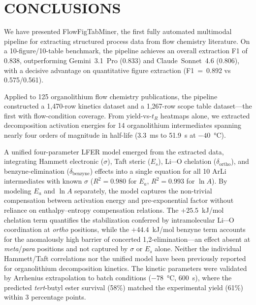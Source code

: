 \documentclass[journal=jcisd8,manuscript=article]{achemso}
\begin{document}

\FloatBarrier
\section{CONCLUSIONS}

We have presented FlowFigTabMiner, the first fully automated multimodal pipeline for extracting structured process data from flow chemistry literature.
On a 10-figure/10-table benchmark, the pipeline achieves an overall extraction F1 of 0.838, outperforming Gemini~3.1~Pro (0.833) and Claude~Sonnet~4.6 (0.806), with a decisive advantage on quantitative figure extraction (F1~=~0.892 vs 0.575/0.561).

Applied to 125 organolithium flow chemistry publications, the pipeline constructed a 1{,}470-row kinetics dataset and a 1{,}267-row scope table dataset---the first with flow-condition coverage.
From yield-vs-$t_R$ heatmaps alone, we extracted decomposition activation energies for 14 organolithium intermediates spanning nearly four orders of magnitude in half-life (3.3~ms to 51.9~s at $-40$~\si{\celsius}).

A unified four-parameter LFER model emerged from the extracted data, integrating Hammett electronic ($\sigma$), Taft steric ($E_s$), Li$\cdots$O chelation ($\delta_{\mathrm{ortho}}$), and benzyne-elimination ($\delta_{\mathrm{benzyne}}$) effects into a single equation for all 10 ArLi intermediates with known $\sigma$ ($R^2 = 0.980$ for $E_a$, $R^2 = 0.993$ for $\ln A$).
By modeling $E_a$ and $\ln A$ separately, the model captures the non-trivial compensation between activation energy and pre-exponential factor without reliance on enthalpy--entropy compensation relations.
The $+25.5$~kJ/mol chelation term quantifies the stabilization conferred by intramolecular Li$\cdots$O coordination at \textit{ortho} positions, while the $+44.4$~kJ/mol benzyne term accounts for the anomalously high barrier of concerted 1,2-elimination---an effect absent at \textit{meta}/\textit{para} positions and not captured by $\sigma$ or $E_s$ alone.
Neither the individual Hammett/Taft correlations nor the unified model have been previously reported for organolithium decomposition kinetics.
The kinetic parameters were validated by Arrhenius extrapolation to batch conditions ($-78$~\si{\celsius}, 600~s), where the predicted \textit{tert}-butyl ester survival (58\%) matched the experimental yield (61\%) within 3 percentage points.
\end{document}
